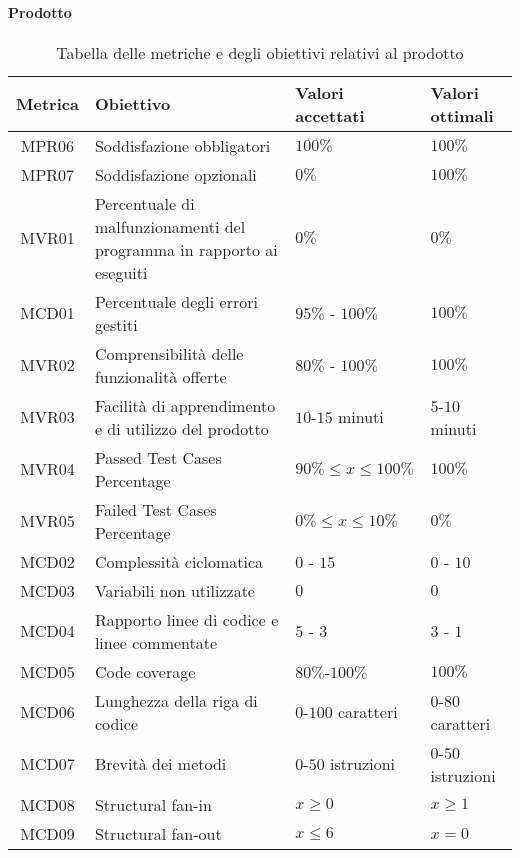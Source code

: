 \paragraph{Prodotto}
\begin{table}[H]
		\begin{center}
			\setlength{\aboverulesep}{0pt}
			\setlength{\belowrulesep}{0pt}
			\setlength{\extrarowheight}{.75ex}
			\begin{tabular}{ c C{6cm} C{3cm} C{3cm} }
				\textbf{Metrica} & \textbf{Obiettivo} & \textbf{Valori accettati} & \textbf{Valori ottimali}  \\
				\toprule
				MPR06 & Soddisfazione  obbligatori & $100 \%$ & $100 \%$ \\
				MPR07 & Soddisfazione  opzionali & $ 0 \%$ & $ 100\%$ \\
				MVR01 & Percentuale di malfunzionamenti del programma in rapporto ai  eseguiti & $ 0\%$  & $0\%$ \\
				MCD01 & Percentuale degli errori gestiti & $ 95\%$ - $100\% $ & $100\%$ \\
				MVR02 & Comprensibilità delle funzionalità offerte & $ 80\%$ - $100\% $ & $100\%$ \\
				MVR03 & Facilità di apprendimento e di utilizzo del prodotto & $10$-$15$ minuti & $5$-$10$ minuti \\
				MVR04 & Passed Test Cases Percentage & $90\% \leq x \leq 100\% $& $100\%$ \\
				MVR05 & Failed Test Cases Percentage & $0\% \leq x \leq 10\% $& $0\%$ \\				
				MCD02 & Complessità ciclomatica & $0$ - $15$ & $0$ - $10$ \\
				MCD03 & Variabili non utilizzate & $0$ & $0$ \\
				MCD04 & Rapporto linee di codice e linee commentate & $5$ - $3$ & $3$ - $1$\\
				MCD05 & Code coverage & $80\%$-$100\%$ & $100\%$ \\
				MCD06 & Lunghezza della riga di codice & $0$-$100$ caratteri & $0$-$80$ caratteri \\
				MCD07 & Brevità dei metodi & $0$-$50$ istruzioni & $0$-$50$ istruzioni \\
				MCD08 & Structural fan-in & $ x \geq 0 $ & $ x \geq 1 $ \\
				MCD09 & Structural fan-out & $ x \leq 6 $ & $ x = 0 $ \\
				\bottomrule
			\end{tabular}
			\caption{Tabella delle metriche e degli obiettivi relativi al prodotto}
		\end{center}
	\end{table}

